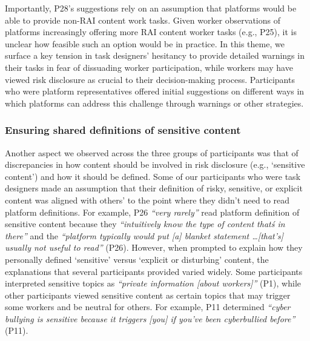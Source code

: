 Importantly, P28's suggestions rely on an assumption that platforms would be able to provide non-RAI content work tasks. Given worker observations of platforms increasingly offering more RAI content worker tasks (e.g., P25), it is unclear how feasible such an option would be in practice. 
In this theme, we surface a key tension in task designers' hesitancy to provide detailed warnings in their tasks in fear of dissuading worker participation, while workers may have viewed risk disclosure as crucial to their decision-making process. Participants who were platform representatives offered initial suggestions on different ways in which platforms can address this challenge through warnings or other strategies. 

\subsubsection{Ensuring shared definitions of sensitive
content}
Another aspect we observed across the three groups of participants was that of discrepancies in how content should be involved in risk disclosure (e.g., `sensitive content') and how it should be defined.
Some of our participants who were task designers made an assumption that their definition of risky, sensitive, or explicit content was aligned with others' to the point where they didn't need to read platform definitions. For example, P26 \textit{``very rarely''} read platform definition of sensitive content because they \textit{``intuitively know the type of content that\'s in there''} and the \textit{``platform typically would put [a] blanket statement \dots [that's] usually not useful to read''} (P26). However, when prompted to explain how they personally defined `sensitive' versus `explicit or disturbing' content, the explanations that several participants provided varied widely. Some participants interpreted sensitive topics as \textit{``private information [about workers]''} (P1), while other participants viewed sensitive content as certain topics that may trigger some workers and be neutral for others. For example, P11 determined \textit{``cyber bullying is sensitive because it triggers [you] if you've been cyberbullied before''} (P11).

